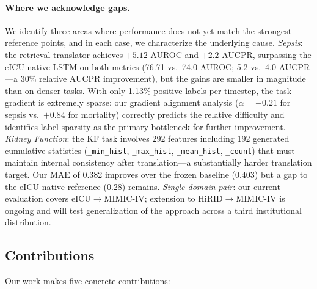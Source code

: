 \paragraph{Where we acknowledge gaps.}
We identify three areas where performance does not yet match the strongest
reference points, and in each case, we characterize the underlying cause.
\emph{Sepsis}: the retrieval translator achieves $+5.12$ AUROC and $+2.2$ AUCPR, surpassing the eICU-native LSTM on both metrics (76.71 vs.\ 74.0 AUROC; 5.2 vs.\ 4.0 AUCPR---a 30\% relative AUCPR improvement), but the gains are smaller in magnitude than on denser tasks.
With only 1.13\% positive labels per timestep, the task gradient is extremely sparse: our gradient alignment analysis ($\alpha = -0.21$ for sepsis vs.\ $+0.84$ for mortality) correctly predicts the relative difficulty and identifies label sparsity as the primary bottleneck for further improvement.
\emph{Kidney Function}: the KF task involves 292 features including 192
generated cumulative statistics (\texttt{\_min\_hist}, \texttt{\_max\_hist},
\texttt{\_mean\_hist}, \texttt{\_count}) that must maintain internal
consistency after translation---a substantially harder translation target.
Our MAE of 0.382 improves over the frozen baseline (0.403) but a gap to the
eICU-native reference (0.28) remains.
\emph{Single domain pair}: our current evaluation covers eICU$\to$MIMIC-IV;
extension to HiRID$\to$MIMIC-IV is ongoing and will test generalization of
the approach across a third institutional distribution.


\subsection{Contributions}
\label{sec:contributions}

Our work makes five concrete contributions:

